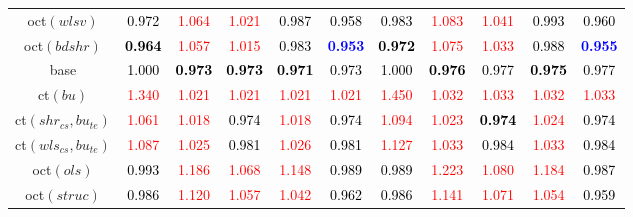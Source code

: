 \begin{tabular}[t]{c|>{}cccc>{}c|ccccc}
oct$(wlsv)$ & \textcolor{black}{0.972} & \textcolor{red}{1.064} & \textcolor{red}{1.021} & \textcolor{black}{0.987} & \textcolor{black}{0.958} & \textcolor{black}{0.983} & \textcolor{red}{1.083} & \textcolor{red}{1.041} & \textcolor{black}{0.993} & \textcolor{black}{0.960}\\
oct$(bdshr)$ & \textcolor{black}{\textbf{0.964}} & \textcolor{red}{1.057} & \textcolor{red}{1.015} & \textcolor{black}{0.983} & \textcolor{blue}{\textbf{0.953}} & \textcolor{black}{\textbf{0.972}} & \textcolor{red}{1.075} & \textcolor{red}{1.033} & \textcolor{black}{0.988} & \textcolor{blue}{\textbf{0.955}}\\
base & \textcolor{black}{1.000} & \textcolor{black}{\textbf{0.973}} & \textcolor{black}{\textbf{0.973}} & \textcolor{black}{\textbf{0.971}} & \textcolor{black}{0.973} & \textcolor{black}{1.000} & \textcolor{black}{\textbf{0.976}} & \textcolor{black}{0.977} & \textcolor{black}{\textbf{0.975}} & \textcolor{black}{0.977}\\
ct$(bu)$ & \textcolor{red}{1.340} & \textcolor{red}{1.021} & \textcolor{red}{1.021} & \textcolor{red}{1.021} & \textcolor{red}{1.021} & \textcolor{red}{1.450} & \textcolor{red}{1.032} & \textcolor{red}{1.033} & \textcolor{red}{1.032} & \textcolor{red}{1.033}\\
ct$(shr_{cs}, bu_{te})$ & \textcolor{red}{1.061} & \textcolor{red}{1.018} & \textcolor{black}{0.974} & \textcolor{red}{1.018} & \textcolor{black}{0.974} & \textcolor{red}{1.094} & \textcolor{red}{1.023} & \textcolor{black}{\textbf{0.974}} & \textcolor{red}{1.024} & \textcolor{black}{0.974}\\
ct$(wls_{cs}, bu_{te})$ & \textcolor{red}{1.087} & \textcolor{red}{1.025} & \textcolor{black}{0.981} & \textcolor{red}{1.026} & \textcolor{black}{0.981} & \textcolor{red}{1.127} & \textcolor{red}{1.033} & \textcolor{black}{0.984} & \textcolor{red}{1.033} & \textcolor{black}{0.984}\\
oct$(ols)$ & \textcolor{black}{0.993} & \textcolor{red}{1.186} & \textcolor{red}{1.068} & \textcolor{red}{1.148} & \textcolor{black}{0.989} & \textcolor{black}{0.989} & \textcolor{red}{1.223} & \textcolor{red}{1.080} & \textcolor{red}{1.184} & \textcolor{black}{0.987}\\
oct$(struc)$ & \textcolor{black}{0.986} & \textcolor{red}{1.120} & \textcolor{red}{1.057} & \textcolor{red}{1.042} & \textcolor{black}{0.962} & \textcolor{black}{0.986} & \textcolor{red}{1.141} & \textcolor{red}{1.071} & \textcolor{red}{1.054} & \textcolor{black}{0.959}\\

\end{tabular}

